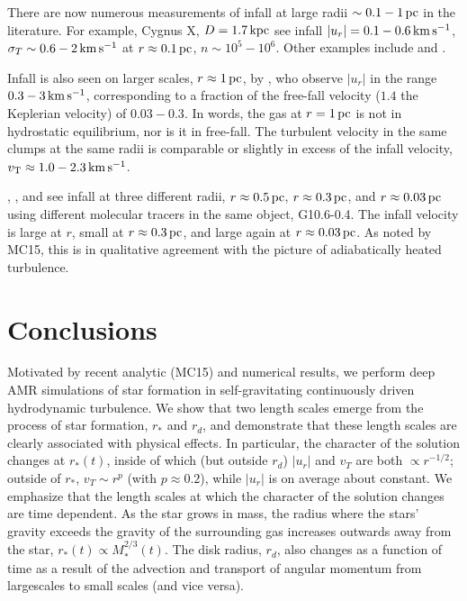 \documentclass[../dissertation.tex]{subfiles}
\begin{document}
There are now numerous measurements of infall at large radii $\sim 0.1-1\,\rm pc$ 
in the literature. For example, \citet{2011A&A...527A.135C} Cygnus X, 
$D=1.7\,\rm kpc$ see infall $|u_r|=0.1-0.6\,\rm km\,s^{-1}$, $\sigma_T\sim 0.6-2\,\rm km\,s^{-1}$ at  
$r\approx 0.1\,\rm pc$, $n\sim 10^5-10^6$. Other examples include \citet{2012ApJ...746..174R,2015A&A...573A.119R} and 
\citet{2013A&A...555A.112P}. 

Infall is also seen on larger scales, $r\approx1\,\rm pc$, by \citet{2016A&A...585A.149W}, who observe $|u_r|$ in the range $0.3-3\,\rm km\,s^{-1}$, corresponding to a fraction of the free-fall velocity ($1.4$ the Keplerian velocity) of $0.03-0.3$. In words, the gas at $r=1\,\rm pc$ is not in hydrostatic equilibrium, nor is it in free-fall. The turbulent velocity in the same clumps at the same radii is comparable or slightly in excess of the infall velocity, $v_{\rm T}\approx 1.0-2.3\,\rm km\,s^{-1}$.

\citet{1986ApJ...304..501H}, \citet{2008ApJ...684.1273K}, and 
\citet{2011A&A...530A..53K} see infall at three different radii, 
$r\approx 0.5\,\rm pc$, $r\approx 0.3\,\rm pc$, and $r\approx 0.03\,\rm pc$ using 
different molecular tracers in the same object, G10.6-0.4. The infall velocity
is large at $r$, small at $r\approx 0.3\,\rm pc$, and large again at $r\approx 0.03\,\rm pc$. 
As noted by MC15, this is in qualitative agreement with the
picture of adiabatically heated turbulence. 

\section{Conclusions}
\label{sec:hydro_conclusions}

Motivated by recent analytic (MC15) and numerical 
\citep{2014ApJ...797...32P,2015ApJ...800...49L} results, we perform deep AMR simulations 
of star formation in self-gravitating continuously driven hydrodynamic turbulence. We show 
that two length scales emerge from the process of star formation, $r_*$ and $r_d$, and demonstrate
that these length scales are clearly associated with physical effects. 
In particular, the character of the 
solution changes at $r_*(t)$, inside of which (but outside $r_d$) $|u_r|$ and  $v_T$ are both
$\propto r^{-1/2}$; outside of $r_*$, $v_T\sim r^{p}$ (with $p\approx0.2$), while $|u_r|$ 
is on average about constant. 
We emphasize that the length scales at which the character of the solution changes are time dependent. 
As the star grows in mass, the radius where the stars' gravity exceeds the gravity of the surrounding gas increases outwards away from the star, 
$r_*(t) \propto M_*^{2/3}(t)$.
The disk radius, $r_d$, also changes as a function of time as a result of the advection and transport of angular momentum from largescales to small scales (and vice versa).
\end{document}
